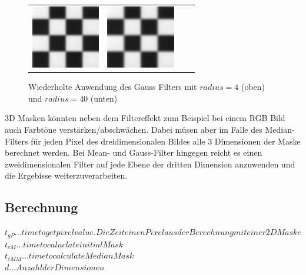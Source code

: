\documentclass[12pt,german]{article}
\begin{document}
\begin{figure} [h!]
\begin{tabular}{| c | c | c | c |}
	\includegraphics[width=3cm]{../testData/Gauss/SchachbrettR40S4v3.jpg} & 	
	\includegraphics[width=3cm]{../testData/Gauss/SchachbrettR40S4v4.jpg} \\
  \end{tabular}
  \caption{Wiederholte Anwendung des Gauss Filters mit $ radius = 4 $ (oben) und $radius = 40 $ (unten)}
  \label{tab:wiederholterGauss}

\end{figure}
3D Masken könnten neben dem Filtereffekt zum Beispiel bei einem RGB Bild auch Farbtöne verstärken/abschwächen. Dabei müsen aber im Falle des Median-Filters für jeden Pixel des dreidimensionalen Bildes alle 3 Dimensionen der Maske berechnet werden. Bei Mean- und Gauss-Filter hingegen reicht es einen zweidimensionalen Filter auf jede Ebene der dritten Dimension anzuwenden und die Ergebisse weiterzuverarbeiten. 


\subsection{Berechnung}

\begin{center}
	$t_{gP} ... time to get pixel value. Die Zeit einen Pixel aus der Berechnung mit einer 2D Maske  $ \\
	$t_{cM} ... time to caluclate initial Mask$ \\
	$t_{cMM} ... time to calculate MedianMask $ \\
	$d ... Anzahl der Dimensionen$ \\
\end{center}
\end{document}
